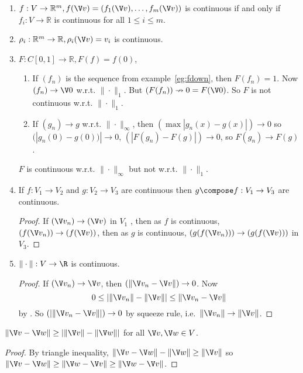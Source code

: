 \documentclass[a4paper]{article}
\theoremstyle{definition}
\begin{document}
\begin{eg}\leavevmode
  \label{eg:continuity}
  \begin{enumerate}
  \item $f:V\to \mathbb{R}^m, f(\V v) = (f_1(\V v), \ldots, f_m(\V v))$ is continuous if and only if $f_i:V\to \mathbb{R}$ is continuous for all $1\leq i \leq m$.
  \item $\rho_i:\mathbb{R}^m\to \mathbb{R}, \rho_i(\V v) =v_i$ is continuous.
  \item $F:C[0,1]\to\mathbb{R}, F(f)=f(0)$,
    \begin{enumerate}
    \item If $(f_n)$ is the sequence from example~\ref{eg:fdown}, then $F(f_n)=1$. Now $(f_n)\to \V 0$ w.r.t. $\|\cdot\|_1$. But $(F(f_n))\nrightarrow 0=F(\V 0)$. So $F$ is not continuous w.r.t. $\|\cdot\|_1$.
      \item If $(g_n)\to g$ w.r.t. $\|\cdot\|_\infty$, then $(\max|g_n(x)-g(x)|)\to 0$ so $(|g_n(0)-g(0))|\to 0$, $(|F(g_n)-F(g)|)\to 0$, so $F(g_n)\to F(g)$.
    \end{enumerate}
    $F$ is continuous w.r.t. $\|\cdot\|_\infty$ but not w.r.t. $\|\cdot\|_1$.
  \item If $f:V_1\to V_2$ and $g:V_2\to V_3$ are continuous then $g\compose f: V_1\to V_3$ are continuous.
    \begin{proof}
      If $(\V v_n) \to (\V v)$ in $V_1$ , then as $f$ is continuous, $(f(\V v_n)) \to (f(\V v))$, then as $g$ is continuous, $(g(f(\V v_n))) \to (g(f(\V v)))$ in $V_3$.
    \end{proof}
  \item $\|\cdot\|: V \to \R$ is continuous.
    \begin{proof}
      If $(\V v_n)\to \V v$, then $(\|\V v_n - \V v\|) \to 0$. Now
    \[
      0 \leq |\|\V v_n\| - \|\V v\|| \leq \|\V v_n - \V v\|
    \]
    by . So $(|\|\V v_n - \V v\||) \to 0$ by squeeze rule, i.e.\ $\|\V v_n\| \to \|\V v\|$.
  \end{proof}
  \end{enumerate}
\end{eg}

\begin{lemma}
  \label{lem:alternate triangle}
  $\|\V v- \V w\| \geq |\|\V v\| - \|\V w\||$ for all $\V v, \V w \in V$.
\end{lemma}

\begin{proof}
  By triangle inequality, $\|\V v- \V w\| - \|\V w\| \geq \|\V v \|$ so $\|\V v - \V w\| \geq \|\V w - \V v\| \geq \|\V w - \V v\|$.
\end{proof}
\end{document}
